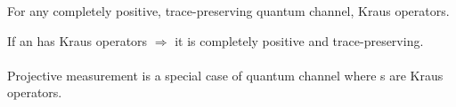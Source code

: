 \documentclass{article}
\begin{document}
    For any completely positive, trace-preserving quantum channel, \exists Kraus operators.

    If an  has Kraus operators $\Rightarrow{}$ it is completely positive and trace-preserving.
\\\\
    Projective measurement is a special case of quantum channel where s are Kraus operators.
\end{document}
